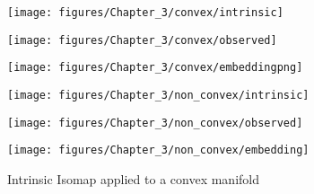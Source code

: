	\begin{figure}[h]
		\begin{centering}
			\begin{minipage}[b][1\totalheight][c]{0.3\columnwidth}%
				\begin{center}
					\texttt{[image: figures/Chapter\_3/convex/intrinsic]}
					\par\end{center}%
			\end{minipage}\hfill{}%
			\begin{minipage}[b][1\totalheight][c]{0.3\columnwidth}%
				\begin{center}
					\texttt{[image: figures/Chapter\_3/convex/observed]}
					\par\end{center}%
			\end{minipage}\hfill{}%
			\begin{minipage}[b][1\totalheight][c]{0.3\columnwidth}%
				\begin{center}
					\texttt{[image: figures/Chapter\_3/convex/embeddingpng]}
					\par\end{center}%
			\end{minipage}
			\par\end{centering}
		
			\begin{centering}
				\begin{minipage}[b]{0.3\columnwidth}%
					\begin{center}
						\texttt{[image: figures/Chapter\_3/non\_convex/intrinsic]}
						\par\end{center}%
				\end{minipage}\hfill{}%
				\begin{minipage}[b]{0.3\columnwidth}%
					\begin{center}
						\texttt{[image: figures/Chapter\_3/non\_convex/observed]}
						\par\end{center}%
				\end{minipage}\hfill{}%
				\begin{minipage}[b]{0.3\columnwidth}%
					\begin{center}
						\texttt{[image: figures/Chapter\_3/non\_convex/embedding]}
						\par\end{center}%
				\end{minipage}
				\par\end{centering}
		\caption{Intrinsic Isomap applied to a convex manifold\label{fig:Intrinsic-isomap-convex}}
	\end{figure}
	
